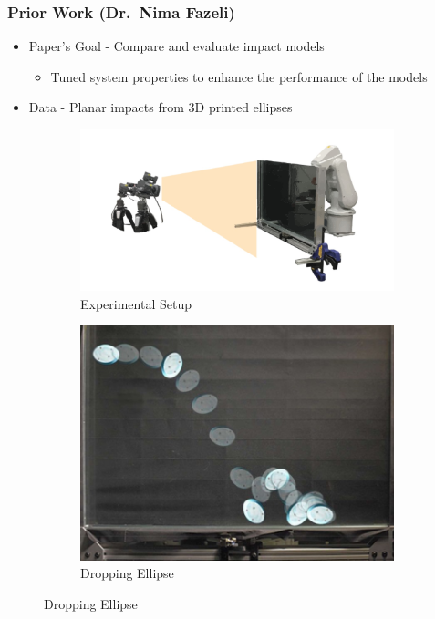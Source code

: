 \begin{frame}
\frametitle{Prior Work (Dr.\ Nima Fazeli)}

\begin{itemize}
    \item Paper's Goal - Compare and evaluate impact models \\
    \begin{itemize}
    \item Tuned system properties to enhance the performance of the models 
    \end{itemize}
    \item Data - Planar impacts from 3D printed ellipses \\
\end{itemize}

\begin{figure}[h!]
    \centering
    \begin{subfigure}[b]{0.5\linewidth}
        \includegraphics[scale=0.4]{figures/nimaFigSetup.jpg}
        \caption{Experimental Setup\cite{nima1}}
        \label{fig:cIRB}
    \end{subfigure}
    \quad
    \begin{subfigure}[b]{0.4\linewidth}
       \includegraphics[scale=0.5]{figures/nimaFigDrop.jpg}
        \caption{Dropping Ellipse\cite{nima1}\cite{nima2}}
        \label{fig:nimaDrop}
    \end{subfigure}
\end{figure}

\end{frame}

